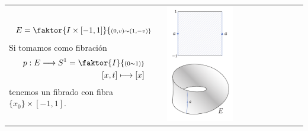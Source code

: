 \begin{enumerate}
\begin{enumerate}
\begin{tabular}{ll}
\begin{minipage}{0.4\textwidth}
\[
E = \faktor{I \times [-1, 1]}{\scriptstyle (0,v) \sim (1, -v)}
\]
Si tomamos como fibración
\begin{align*}
p : E \longrightarrow S^1 = \faktor{I}{\scriptstyle (0 \sim 1)} \\
[x,t] \longmapsto [x]
\end{align*}
tenemos un fibrado con fibra $\{x_0\} \times [-1, 1]$.
\end{minipage}
&
\begin{minipage}{0.5\textwidth}
\centering
\includegraphics[width = 0.5\textwidth]{images/mobius}
\end{minipage}
\end{tabular}


\end{enumerate}
\end{enumerate}
